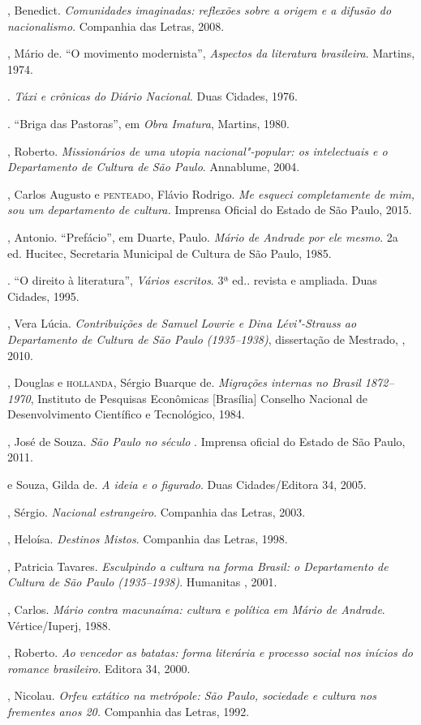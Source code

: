 \begin{bibliohedra}
, Benedict. \emph{Comunidades imaginadas: reflexões sobre a origem e a
difusão do nacionalismo}. Companhia das Letras, 2008.

, Mário de. ``O movimento modernista'', \emph{Aspectos da
literatura brasileira}. Martins, 1974.

\titidem. \emph{Táxi e crônicas do Diário Nacional.} Duas
Cidades, 1976.

\titidem. ``Briga das Pastoras'', em \emph{Obra Imatura},
Martins, 1980.

, Roberto. \emph{Missionários de uma utopia
nacional"-popular: os intelectuais e o Departamento de Cultura de São
Paulo}. Annablume, 2004.

, Carlos Augusto e \textsc{penteado}, Flávio Rodrigo. \emph{Me esqueci
completamente de mim, sou um departamento de cultura.} Imprensa Oficial
do Estado de São Paulo, 2015.

, Antonio. ``Prefácio'', em Duarte, Paulo. \emph{Mário de Andrade
por ele mesmo}. 2a ed. Hucitec, Secretaria Municipal de Cultura de São
Paulo, 1985.

\titidem. ``O direito à literatura'', \emph{Vários escritos}. 3ª
ed.. revista e ampliada. Duas Cidades, 1995.

, Vera Lúcia. \emph{Contribuições de Samuel Lowrie e Dina
Lévi"-Strauss ao Departamento de Cultura de São Paulo (1935--1938)},
dissertação de Mestrado, , 2010.

, Douglas e \textsc{hollanda}, Sérgio Buarque de. \emph{Migrações internas
no Brasil 1872--1970}, Instituto de Pesquisas Econômicas {[}Brasília{]}
Conselho Nacional de Desenvolvimento Científico e Tecnológico, 1984.

, José de Souza. \emph{São Paulo no século }. Imprensa oficial
do Estado de São Paulo, 2011.

 e Souza, Gilda de. \emph{A ideia e o figurado}. Duas
Cidades/Editora 34, 2005.

, Sérgio. \emph{Nacional estrangeiro}. Companhia das Letras, 2003.

, Heloísa. \emph{Destinos Mistos}. Companhia das Letras, 1998.

, Patricia Tavares. \emph{Esculpindo a cultura na forma Brasil:
o Departamento de Cultura de São Paulo (1935--1938)}. Humanitas
, 2001.

, Carlos. \emph{Mário contra macunaíma: cultura e política em
Mário de Andrade}. Vértice/Iuperj, 1988.

, Roberto. \emph{Ao vencedor as batatas: forma literária e
processo social nos inícios do romance brasileiro}. Editora 34, 2000.

, Nicolau. \emph{Orfeu extático na metrópole: São Paulo,
sociedade e cultura nos frementes anos 20.} Companhia das Letras, 1992.
\end{bibliohedra}

